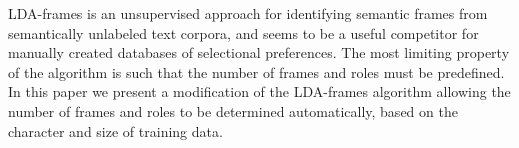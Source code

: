LDA-frames is an unsupervised approach for identifying semantic frames from semantically unlabeled text corpora, and seems
 to be a useful competitor for manually created databases of selectional
 preferences. 
 The most limiting property of the algorithm is such that the number of frames
 and roles must be predefined. 
 In this paper we present a modification of the LDA-frames algorithm allowing
 the number of frames and roles to be determined automatically, based on the
 character and size of training data.

